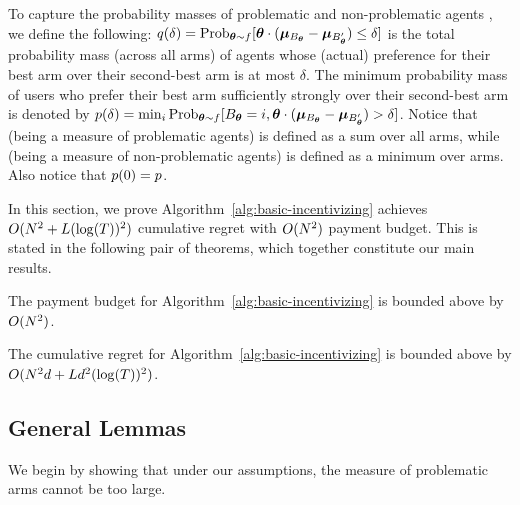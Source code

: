 To capture the probability masses of problematic and non-problematic
agents , we define the following:
$\AlmostTied{\delta} = \Prob[\AgV \sim \AgentDist]{%
\AgV \cdot (\ArmV{\Best{\AgV}} - \ArmV{\Second{\AgV}}) \leq \delta}$
is the total probability mass (across all arms) of agents
whose (actual) preference for their best arm over their second-best
arm is at most $\delta$.
The minimum probability mass of users who prefer their best arm
sufficiently strongly over their second-best arm is denoted by
$\ClearPref{\delta} = \min_{i}
\Prob[\AgV \sim \AgentDist]{\Best{\AgV}=i,%
\AgV \cdot (\ArmV{\Best{\AgV}} - \ArmV{\Second{\AgV}}) > \delta}$.
Notice that \AlmostTied{\delta} (being a measure of problematic
agents) is defined as a sum over all arms,
while  \ClearPref{\delta} (being a measure of non-problematic agents)
is defined as a minimum over arms.
Also notice that $p(0) = p$.


In this section, we prove Algorithm~\ref{alg:basic-incentivizing} achieves $O(N^2+L(\log(T))^2)$ cumulative regret with $O(N^2)$ payment budget.  This is stated in the following pair of theorems, which together constitute our main results.

\begin{theorem}
The payment budget for Algorithm~\ref{alg:basic-incentivizing} is bounded above by $O(N^2)$. 
\label{rst:budget}
\end{theorem}


\begin{theorem}
The cumulative regret for Algorithm~\ref{alg:basic-incentivizing}
is bounded above by $O(N^2 d + L d^2(\log(T))^2)$.
\label{rst:regret}
\end{theorem}

\subsection{General Lemmas}

We begin by showing that under our assumptions, the measure of
problematic arms cannot be too large.

